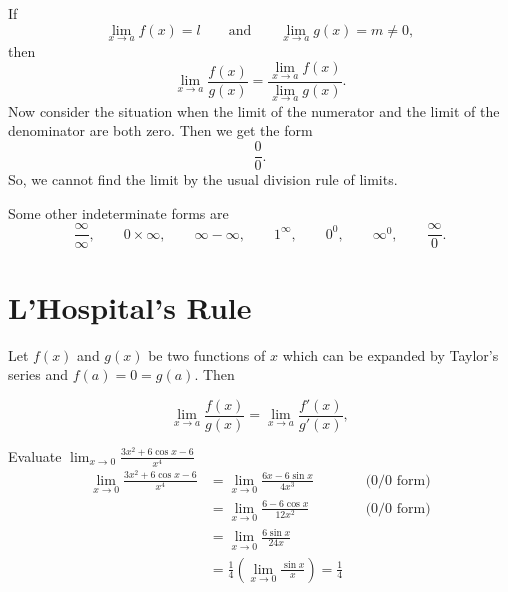 \documentclass[12pt]{article}
\begin{document}

If
\[
  \lim_{x\to a}f(x)=l \qquad\text{and}\qquad \lim_{x\to a}g(x)=m\neq 0,
\]
then
\[
  \lim_{x\to a}\frac{f(x)}{g(x)}=\frac{\lim\limits_{x\to a}f(x)}{\lim\limits_{x\to a}g(x)}.
\]
Now consider the situation when the limit of the numerator and the limit of the
denominator are both zero. Then we get the form
\[
  \frac{0}{0}.
\]
So, we cannot find the limit by the usual division rule of limits. 

Some other indeterminate forms are
\[
  \frac{\infty}{\infty},\qquad 0\times\infty,\qquad \infty-\infty,\qquad 1^{\infty},\qquad
  0^{0},\qquad \infty^{0},\qquad \frac{\infty}{0}.
\]

\section*{L'Hospital's Rule}

Let $f(x)$ and $g(x)$ be two functions of $x$ which can be expanded by Taylor's series and
$f(a)=0=g(a)$. Then
\begin{formulabox}
\[
  \lim_{x\to a}\frac{f(x)}{g(x)}=\lim_{x\to a}\frac{f'(x)}{g'(x)},
\]
\end{formulabox}

Evaluate $\displaystyle\lim_{x\to 0}\frac{3x^{2}+6\cos x-6}{x^{4}}$
\begin{align*}
  \lim_{x\to 0}\frac{3x^{2}+6\cos x-6}{x^{4}}
    &=\lim_{x\to 0}\frac{6x-6\sin x}{4x^{3}} &&\text{(0/0 form)}\\
    &=\lim_{x\to 0}\frac{6-6\cos x}{12x^{2}} &&\text{(0/0 form)}\\
    &=\lim_{x\to 0}\frac{6\sin x}{24x}\\
    &=\frac{1}{4}\left(\lim_{x\to 0}\frac{\sin x}{x}\right)=\frac{1}{4}
\end{align*}
\end{document}
